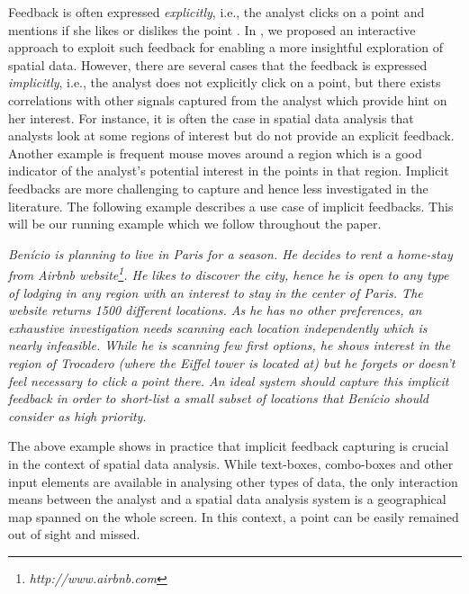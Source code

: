 \documentclass[sigconf,edbt]{acmart-edbt2019}
\begin{document}
\vspace{2pt}
Feedback is often expressed {\em explicitly}, i.e., the analyst clicks on a point and mentions if she likes or dislikes the point \cite{kamat2014distributed,Omidvar-Tehrani:2015,omidvar2017geoguide}. In \cite{omidvar2017geoguide}, we proposed an interactive approach to exploit such feedback for enabling a more insightful exploration of spatial data. However, there are several cases that the feedback is expressed {\em implicitly}, i.e., the analyst does not explicitly click on a point, but there exists correlations with other signals captured from the analyst which provide hint on her interest. For instance, it is often the case in spatial data analysis that analysts look at some regions of interest but do not provide an explicit feedback. Another example is frequent mouse moves around a region which is a good indicator of the analyst's potential interest in the points in that region. Implicit feedbacks are more challenging to capture and hence less investigated in the literature. The following example describes a use case of implicit feedbacks. This will be our running example which we follow throughout the paper.

\vspace{2pt}
 {\em Ben\'icio is planning to live in Paris for a season. He decides to rent a home-stay from Airbnb website\footnote{\it http://www.airbnb.com}. He likes to discover the city, hence he is open to any type of lodging in any region with an interest to stay in the center of Paris. The website returns 1500 different locations. As he has no other preferences, an exhaustive investigation needs scanning each location independently which is nearly infeasible. While he is scanning few first options, he shows interest in the region of Trocadero (where the Eiffel tower is located at) but he forgets or doesn't feel necessary to click a point there. An ideal system should capture this implicit feedback in order to short-list a small subset of locations that Ben\'icio should consider as high priority}.

\vspace{2pt}
The above example shows in practice that implicit feedback capturing is crucial in the context of spatial data analysis. While text-boxes, combo-boxes and other input elements are available in analysing other types of data, the only interaction means between the analyst and a spatial data analysis system is a geographical map spanned on the whole screen. In this context, a point can be easily remained out of sight and missed.
\end{document}
